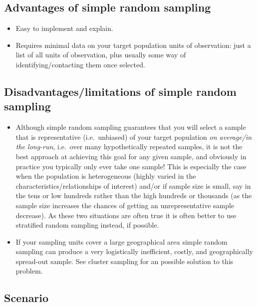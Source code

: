 \documentclass[
]{book}
\begin{document}
\hypertarget{advantages-of-simple-random-sampling}{%
\subsection{Advantages of simple random sampling}\label{advantages-of-simple-random-sampling}}

\begin{itemize}
\item
  Easy to implement and explain.
\item
  Requires minimal data on your target population units of observation: just a list of all units of observation, plus usually some way of identifying/contacting them once selected.
\end{itemize}

\hypertarget{disadvantageslimitations-of-simple-random-sampling}{%
\subsection{Disadvantages/limitations of simple random sampling}\label{disadvantageslimitations-of-simple-random-sampling}}

\begin{itemize}
\item
  Although simple random sampling guarantees that you will select a sample that is representative (i.e.~unbiased) of your target population \emph{on average/in the long-run}, i.e.~over many hypothetically repeated samples, it is not the best approach at achieving this goal for any given sample, and obviously in practice you typically only ever take one sample! This is especially the case when the population is heterogeneous (highly varied in the characteristics/relationships of interest) and/or if sample size is small, say in the tens or low hundreds rather than the high hundreds or thousands (as the sample size increases the chances of getting an unrepresentative sample decrease). As these two situations are often true it is often better to use stratified random sampling instead, if possible.
\item
  If your sampling units cover a large geographical area simple random sampling can produce a very logistically inefficient, costly, and geographically spread-out sample. See cluster sampling for an possible solution to this problem.
\end{itemize}

\hypertarget{scenario}{%
\subsection{Scenario}\label{scenario}}
\end{document}
